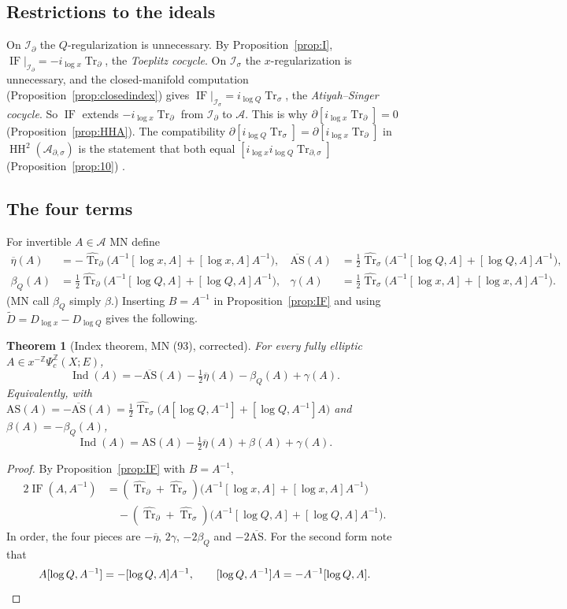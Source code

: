 \documentclass[11pt,oneside,reqno]{article}
\DeclareMathOperator{\HH}{HH}
\DeclareMathOperator{\Tr}{Tr}
\DeclareMathOperator{\Ind}{Ind}
\DeclareMathOperator{\IF}{IF}
\newcommand{\Z}{\mathbb Z}
\newcommand{\cA}{\mathcal A}
\newcommand{\Is}{\mathcal I_\sigma}
\newcommand{\Id}{\mathcal I_\partial}
\newcommand{\Ads}{\mathcal A_{\partial,\sigma}}
\newcommand{\Psic}{\Psi_{c}}
\newcommand{\Trs}{\Tr_\sigma}
\newcommand{\Trd}{\Tr_\partial}
\newcommand{\Trds}{\Tr_{\partial,\sigma}}
\newcommand{\hTrs}{\widehat{\Tr}_\sigma}
\newcommand{\hTrd}{\widehat{\Tr}_\partial}
\newcommand{\lQ}{\log Q}
\newcommand{\lx}{\log x}
\newcommand{\bAS}{\overline{\mathrm{AS}}}
\newcommand{\AS}{\mathrm{AS}}
\newcommand{\etab}{\overline\eta}
\theoremstyle{plain}
\newtheorem{theorem}{Theorem}[section]
\theoremstyle{definition}
\theoremstyle{remark}
\begin{document}
\subsection{Restrictions to the ideals}
On \(\Id\) the \(Q\)-regularization is unnecessary. By
Proposition~\ref{prop:I}, \(\IF|_{\Id}=-i_{\lx}\Trd\), the
\emph{Toeplitz cocycle}. On \(\Is\) the \(x\)-regularization is
unnecessary, and the closed-manifold computation
(Proposition~\ref{prop:closedindex}) gives \(\IF|_{\Is}=i_{\lQ}\Trs\),
the \emph{Atiyah--Singer cocycle}. So \(\IF\) extends \(-i_{\lx}\Trd\)
from \(\Id\) to \(\cA\). This is why \(\partial[i_{\lx}\Trd]=0\)
(Proposition~\ref{prop:HHA}). The compatibility
\(\partial[i_{\lQ}\Trs]=\partial[i_{\lx}\Trd]\) in \(\HH^2(\Ads)\) is
the statement that both equal \([i_{\lx}i_{\lQ}\Trds]\)
(Proposition~\ref{prop:10}) \cite[p.~30]{MN}.

\subsection{The four terms}
For invertible \(A\in\cA\) MN define \cite[(89)--(92)]{MN}
\begin{align*}
 \etab(A)&=-\hTrd\bigl(A^{-1}[\lx,A]+[\lx,A]A^{-1}\bigr),&
 \bAS(A)&=\tfrac12\hTrs\bigl(A^{-1}[\lQ,A]+[\lQ,A]A^{-1}\bigr),\\
 \beta_Q(A)&=\tfrac12\hTrd\bigl(A^{-1}[\lQ,A]+[\lQ,A]A^{-1}\bigr),&
 \gamma(A)&=\tfrac12\hTrs\bigl(A^{-1}[\lx,A]+[\lx,A]A^{-1}\bigr).
\end{align*}
(MN call \(\beta_Q\) simply \(\beta\).) Inserting \(B=A^{-1}\) in
Proposition~\ref{prop:IF} and using \(\widetilde D=D_{\lx}-D_{\lQ}\) gives
the following.

\begin{theorem}[Index theorem, MN (93), corrected]\label{thm:index}
For every fully elliptic \(A\in x^{-\Z}\Psic^{\Z}(X;E)\),
\[
 \Ind(A)=-\bAS(A)-\tfrac12\etab(A)-\beta_Q(A)+\gamma(A).
\]
Equivalently, with \(\AS(A)=-\bAS(A)=\frac12\hTrs\bigl(A[\lQ,A^{-1}]+
[\lQ,A^{-1}]A\bigr)\) and \(\beta(A)=-\beta_Q(A)\),
\[
 \Ind(A)=\AS(A)-\tfrac12\etab(A)+\beta(A)+\gamma(A).
\]
\end{theorem}

\begin{proof}
By Proposition~\ref{prop:IF} with \(B=A^{-1}\),
\begin{align*}
 2\IF(A,A^{-1})&=(\hTrd+\hTrs)\bigl(A^{-1}[\lx,A]+[\lx,A]A^{-1}\bigr)\\
 &\quad-(\hTrd+\hTrs)\bigl(A^{-1}[\lQ,A]+[\lQ,A]A^{-1}\bigr).
\end{align*}
In order, the four pieces are \(-\etab\), \(2\gamma\), \(-2\beta_Q\) and
\(-2\bAS\). For the second form note that
\[
 A[\lQ,A^{-1}]=-[\lQ,A]A^{-1},\qquad[\lQ,A^{-1}]A=-A^{-1}[\lQ,A]. \qedhere
\]
\end{proof}
\end{document}
